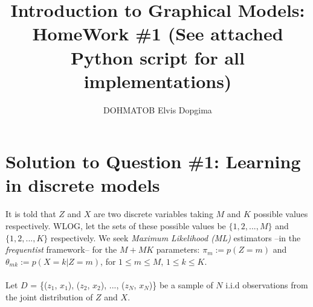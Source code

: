 \documentclass[9pt]{article}
\begin{document}
\title{Introduction to Graphical Models: HomeWork \#1 (See attached Python script for all implementations)}
\author{DOHMATOB Elvis Dopgima\\
}
\maketitle
\section{Solution to Question \#1: Learning in discrete models}
It is told that $Z$ and $X$ are two discrete variables taking $M$ and $K$ possible values respectively. WLOG, let the sets of these possible values be
 $\{1, 2, ..., M\}$ and $\{1, 2, ..., K\}$ respectively. We seek \textit{Maximum Likelihood (ML)} estimators --in the \textit{frequentist}
framework-- for the $M + MK$ parameters:
 $\pi_{m} := p(Z = m)$ and $\theta_{mk} := p(X = k | Z = m)$, for $1 \le m \le M$, $1 \le k \le K$.%
 \\ \\
Let $D$ = \{($z_{1}$, $x_{1}$), ($z_{2}$, $x_{2}$), ..., ($z_{N}$, $x_{N}$)\} be a sample of $N$ i.i.d
 observations from the joint distribution of $Z$ and $X$.
\end{document}
